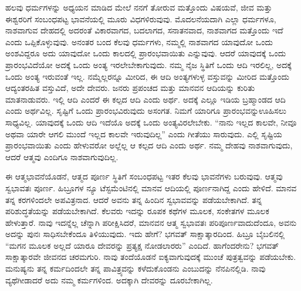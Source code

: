 ಹಲವು ಧರ್ಮಗಳನ್ನು ಅಧ್ಯಯನ ಮಾಡಿದ ಮೇಲೆ ನನಗೆ ತೋರುವ ಮತ್ತೊಂದು ವಿಷಯವೆ, ಜೀವ ಮತ್ತು ಈಶ್ವರರಿಗೆ ಸಂಬಂಧಪಟ್ಟ ಭಾವನೆಯಲ್ಲಿ ಮೂರು ವಿಧಗಳಿರುವುವು. ಮೊದಲನೆಯದಾಗಿ ಎಲ್ಲಾ ಧರ್ಮಗಳೂ, ನಾಶವಾಗುವ ದೇಹದಲ್ಲಿ ಅದರಂತೆ ವಿಕಾರವಾಗದ, ಬದಲಾಗದ, ಸನಾತನವಾದ, ನಾಶವಾಗದ ಮತ್ತೊಂದು ಇದೆ ಎಂದು ಒಪ್ಪಿಕೊಳ್ಳುವುವು. ಅನಂತರ ಬಂದ ಕೆಲವು ಧರ್ಮಗಳು, ನಮ್ಮಲ್ಲಿ ನಾಶವಾಗದ ಯಾವುದೋ ಒಂದು ಅಂಶವಿದ್ದರೂ ಅದು ಯಾವುದೋ ಒಂದು ಕಾಲದಲ್ಲಿ ಪ್ರಾರಂಭವಾಯಿತು ಎನ್ನುವುವು. ಆದರೆ ಯಾವುದಕ್ಕೆ ಒಂದು ಪ್ರಾರಂಭವಿದೆಯೋ ಅದಕ್ಕೆ ಒಂದು ಅಂತ್ಯ ಇರಲೇಬೇಕಾಗುವುದು. ನಮ್ಮ ನೈಜ ಸ್ಥಿತಿಗೆ ಒಂದು ಆದಿ ಇರಲಿಲ್ಲ, ಅದಕ್ಕೆ ಒಂದು ಅಂತ್ಯ ಇರುವಂತೆ ಇಲ್ಲ. ನಮ್ಮೆಲ್ಲರನ್ನೂ ಮೀರಿದ, ಈ ಆದಿ ಅಂತ್ಯಗಳುಳ್ಳ ವಸ್ತುವನ್ನು ಮೀರಿದ ಮತ್ತೊಂದು ಆದ್ಯಂತರಹಿತ ವಸ್ತುವಿದೆ, ಅದೇ ದೇವರು. ಜನರು ಪ್ರಪಂಚದ ಮತ್ತು ಮಾನವನ ಆದಿಯನ್ನು ಕುರಿತು ಮಾತನಾಡುವರು. ಇಲ್ಲಿ ಆದಿ ಎಂದರೆ ಈ ಕಲ್ಪದ ಆದಿ ಎಂದು ಅರ್ಥ. ಅದಕ್ಕೆ ಎಲ್ಲೂ ಇಡಿಯ ಬ್ರಹ್ಮಾಂಡದ ಆದಿ ಎಂದು ಅರ್ಥವಿಲ್ಲ. ಸೃಷ್ಟಿಗೆ ಒಂದು ಪ್ರಾರಂಭವಿರುವುದು ಅಸಂಗತ. ನಿಮಗೆ ಯಾರಿಗೂ ಪ್ರಾರಂಭವನ್ನು\break ಊಹಿಸಲು ಸಾಧ್ಯವಿಲ್ಲ. ಯಾವುದಕ್ಕೆ ಒಂದು ಆದಿ ಇದೆಯೊ ಅದಕ್ಕೆ ಒಂದು ಅಂತ್ಯವಿರಲೇಬೇಕು. “ನಾನು ಇಲ್ಲದ ಕಾಲವೇ, ನೀವೂ ಅಥವಾ ಯಾರೇ ಆಗಲಿ ಮುಂದೆ ಇಲ್ಲದ ಕಾಲವೇ ಇರುವುದಿಲ್ಲ” ಎಂದು ಗೀತೆಯು ಸಾರುವುದು. ಎಲ್ಲಿ ಸೃಷ್ಟಿಯ ಪ್ರಾರಂಭವಾಯಿತು ಎಂದು ಹೇಳುವರೋ ಅಲ್ಲೆಲ್ಲ ಆ ಕಲ್ಪದ ಆದಿ ಎಂದು ಅರ್ಥ. ನಮ್ಮ ದೇಹವು ನಾಶವಾಗುವುದು, ಆದರೆ ಆತ್ಮವು ಎಂದಿಗೂ ನಾಶವಾಗುವುದಿಲ್ಲ.

ಈ ಆತ್ಮಭಾವನೆಯೊಡನೆ, ಆತ್ಮದ ಪೂರ್ಣ ಸ್ಥಿತಿಗೆ ಸಂಬಂಧಪಟ್ಟ ಇತರ ಕೆಲವು ಭಾವನೆಗಳು ಬರುವುವು. ಆತ್ಮವು ಸ್ವಭಾವತಃ ಪೂರ್ಣ. ಹಿಬ್ರೂಗಳ ನ್ಯೂ ಟೆಸ್ಟಮೆಂಟಿನಲ್ಲಿ ಮಾನವ ಆದಿಯಲ್ಲಿ ಪೂರ್ಣನಾಗಿದ್ದ ಎಂದು ಹೇಳಿದೆ. ಮಾನವ ತನ್ನ ಕರಗಳಿಂದಲೇ ಅಪವಿತ್ರನಾದ. ಆದರೆ ಅವನು ತನ್ನ ಹಿಂದಿನ ಸ್ವಭಾವವನ್ನು ಪಡೆಯಬೇಕಾಗಿದೆ. ತನ್ನ ಪರಿಶುದ್ಧತೆಯನ್ನು ಪಡೆಯಬೇಕಾಗಿದೆ. ಕೆಲವರು ಇದನ್ನು ರೂಪಕ ಕಥೆಗಳ ಮೂಲಕ, ಸಂಕೇತಗಳ ಮೂಲಕ ಹೇಳುತ್ತಾರೆ. ನಾವು ಇದನ್ನೆಲ್ಲ ಚೆನ್ನಾಗಿ ಪರೀಕ್ಷಿಸಿದರೆ, ಮಾನವನ ಆತ್ಮ ಸ್ವಭಾವತಃ ಪರಿಪೂರ್ಣವಾದುದೆಂದೂ, ಅವನು ಅದನ್ನು ಪುನಃ ಸಾಧಿಸಬೇಕೆಂದೂ ತಿಳಿಯುವುದು. ಇದು ಹೇಗೆ? ಭಗವತ್ ಸಾಕ್ಷಾತ್ಕಾರದಿಂದ. ಹಿಬ್ರೂ ಬೈಬಲಿನಲ್ಲಿ “ಮಗನ ಮೂಲಕ ಅಲ್ಲದೆ ಯಾರೂ ದೇವರನ್ನು ಪ್ರತ್ಯಕ್ಷ ನೋಡಲಾರರು'' ಎಂದಿದೆ. ಹಾಗೆಂದರೇನು? ಭಗವತ್ ಸಾಕ್ಷಾತ್ಕಾರವೇ ಜೀವನದ ಚರಮಗುರಿ. ನಾವು ತಂದೆಯೊಡನೆ ಐಕ್ಯವಾಗುವುದಕ್ಕೆ ಮುಂಚೆ ಪುತ್ರತ್ವವನ್ನು ಪಡೆಯಬೇಕು. ಮನುಷ್ಯನು ತನ್ನ ಕರ್ಮದಿಂದಲೇ ತನ್ನ ಪಾವಿತ್ರ್ಯವನ್ನು ಕಳೆದುಕೊಂಡನು ಎಂಬುದನ್ನು ನೆನಪಿನಲ್ಲಿಡಿ. ನಾವು ವ್ಯಥೆಗೀಡಾದರೆ ಅದು ನಮ್ಮ ಕರ್ಮಗಳಿಂದ. ಅದಕ್ಕಾಗಿ ದೇವರನ್ನು ದೂರಬೇಕಾಗಿಲ್ಲ.

